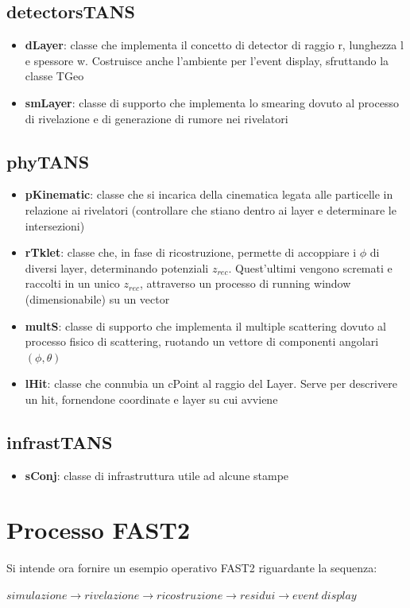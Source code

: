 \documentclass{article}
\begin{document}
\subsection{detectors\textunderscore TANS}
\begin{itemize}
\item \textbf{dLayer}: classe che implementa il concetto di detector di raggio r, lunghezza l e spessore w. Costruisce anche l'ambiente per l'event display, sfruttando la classe TGeo
\item \textbf{smLayer}: classe di supporto che implementa lo smearing dovuto al processo di rivelazione e di generazione di rumore nei rivelatori

\end{itemize}

\subsection{phy\textunderscore TANS}
\begin{itemize}
\item \textbf{pKinematic}: classe che si incarica della cinematica legata alle particelle in relazione ai rivelatori (controllare che stiano dentro ai layer e determinare le intersezioni)
\item \textbf{rTklet}: classe che, in fase di ricostruzione, permette di accoppiare i $\phi$ di diversi layer, determinando potenziali $z_{rec}$. Quest'ultimi vengono scremati e raccolti in un unico $z_{rec}$, attraverso un processo di running window (dimensionabile) su un vector
\item \textbf{multS}: classe di supporto che implementa il multiple scattering dovuto al processo fisico di scattering, ruotando un vettore di componenti angolari $(\phi, \theta)$
\item \textbf{lHit}: classe che connubia un cPoint al raggio del Layer. Serve per descrivere un hit, fornendone coordinate e layer su cui avviene
\end{itemize}

\subsection{infrast\textunderscore TANS}
\begin{itemize}
\item \textbf{sConj}: classe di infrastruttura utile ad alcune stampe
\end{itemize}

\section{Processo FAST2}
Si intende ora fornire un esempio operativo FAST2 riguardante la sequenza:
\begin{center}
 $simulazione \rightarrow rivelazione \rightarrow ricostruzione \rightarrow residui \rightarrow event \ display$
 \end{center}
\end{document}
